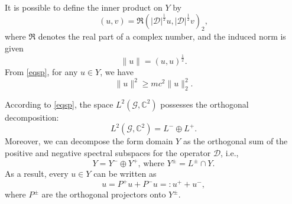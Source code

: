 \documentclass[11pt]{amsart}
\newcommand{\abs}[1]{\lvert#1\rvert}
\newcommand{\norm}[1]{\lVert#1\rVert}
\newcommand{\D}{\mathcal{D}}
\newcommand{\G}{\mathcal{G}}
\numberwithin{equation}{section}
\begin{document}

It is possible to define the inner product on $Y$ by
\begin{equation*}
    (u,v) =\Re(\abs{\D}^\frac{1}{2}u,\abs{\D}^\frac{1}{2}v)_2,
\end{equation*}
where $\Re$ denotes the real part of a complex number, and the induced norm is given
\begin{equation*}
    \norm{u} = (u,u)^\frac{1}{2}.
\end{equation*}
From \eqref{eqsp}, for any $u \in Y$, we have
$$\norm{u}^2 \geq mc^2\norm{u}_2^2.$$

According to \eqref{eqsp}, the space $L^2(\G, \mathbb{C}^2)$ possesses the orthogonal decomposition:
\begin{equation}
     L^2(\G, \mathbb{C}^2) = L^- \oplus L^+.
\end{equation}
Moreover, we can decompose the form domain $Y$ as the orthogonal sum of the positive and negative spectral subspaces for the operator $\D$,
i.e.,
\begin{equation}
    Y = Y^- \oplus Y^+ \text{, where } Y^\pm = L^\pm \cap Y.
\end{equation}
As a result, every $u \in Y$ can be written as
\begin{equation*}
    u = P^+u +P^-u =: u^+ + u^-,
\end{equation*}
where
$P^\pm$ are the orthogonal projectors onto $Y^\pm$.
\end{document}
